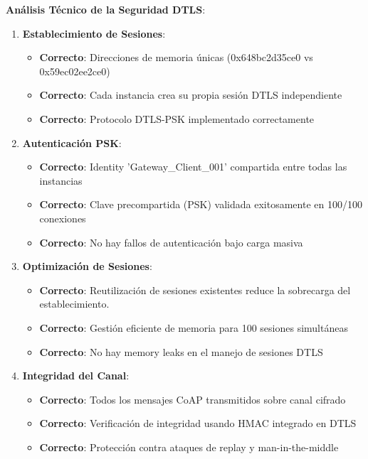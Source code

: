 \textbf{Análisis Técnico de la Seguridad DTLS}:

\begin{enumerate}
    \item \textbf{Establecimiento de Sesiones}:
    \begin{itemize}
        \item \textcolor{successgreen}{\textbf{Correcto}}: Direcciones de memoria únicas (0x648bc2d35ce0 vs 0x59ec02ee2ce0)
        \item \textcolor{successgreen}{\textbf{Correcto}}: Cada instancia crea su propia sesión DTLS independiente
        \item \textcolor{successgreen}{\textbf{Correcto}}: Protocolo DTLS-PSK implementado correctamente
    \end{itemize}
    
    \item \textbf{Autenticación PSK}:
    \begin{itemize}
        \item \textcolor{successgreen}{\textbf{Correcto}}: Identity 'Gateway\_Client\_001' compartida entre todas las instancias
        \item \textcolor{successgreen}{\textbf{Correcto}}: Clave precompartida (PSK) validada exitosamente en 100/100 conexiones
        \item \textcolor{successgreen}{\textbf{Correcto}}: No hay fallos de autenticación bajo carga masiva
    \end{itemize}
    
    \item \textbf{Optimización de Sesiones}:
    \begin{itemize}
        \item \textcolor{successgreen}{\textbf{Correcto}}: Reutilización de sesiones existentes reduce la sobrecarga del establecimiento.
        \item \textcolor{successgreen}{\textbf{Correcto}}: Gestión eficiente de memoria para 100 sesiones simultáneas
        \item \textcolor{successgreen}{\textbf{Correcto}}: No hay memory leaks en el manejo de sesiones DTLS
    \end{itemize}
    
    \item \textbf{Integridad del Canal}:
    \begin{itemize}
        \item \textcolor{successgreen}{\textbf{Correcto}}: Todos los mensajes CoAP transmitidos sobre canal cifrado
        \item \textcolor{successgreen}{\textbf{Correcto}}: Verificación de integridad usando HMAC integrado en DTLS
        \item \textcolor{successgreen}{\textbf{Correcto}}: Protección contra ataques de replay y man-in-the-middle
    \end{itemize}
\end{enumerate}

